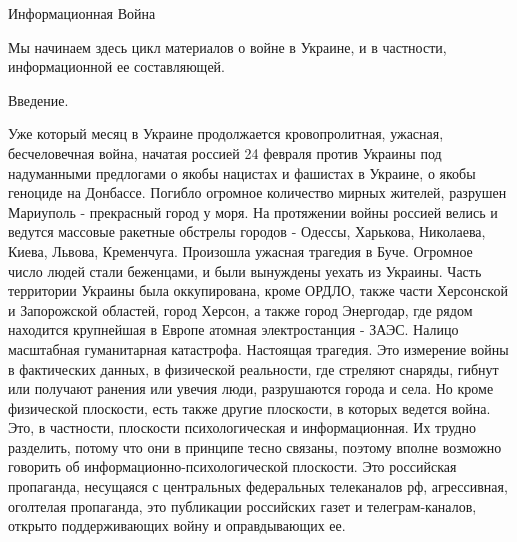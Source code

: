  
 
 
 
 

Информационная Война

Мы начинаем здесь цикл материалов о войне в Украине, и в частности,
информационной ее составляющей.

Введение.

Уже который месяц в Украине продолжается кровопролитная, ужасная, бесчеловечная
война, начатая россией 24 февраля против Украины под надуманными предлогами о
якобы нацистах и фашистах в Украине, о якобы геноциде на Донбассе. Погибло
огромное количество мирных жителей, разрушен Мариуполь - прекрасный город у
моря. На протяжении войны россией велись и ведутся массовые ракетные обстрелы
городов - Одессы, Харькова, Николаева, Киева, Львова, Кременчуга. Произошла
ужасная трагедия в Буче. Огромное число людей стали беженцами, и были вынуждены
уехать из Украины. Часть территории Украины была оккупирована, кроме ОРДЛО,
также части Херсонской и Запорожской областей, город Херсон, а также город
Энергодар, где рядом находится крупнейшая в Европе атомная электростанция -
ЗАЭС. Налицо масштабная гуманитарная катастрофа. Настоящая трагедия. Это
измерение войны в фактических данных, в физической реальности, где стреляют
снаряды, гибнут или получают ранения или увечия люди, разрушаются города и
села. Но кроме физической плоскости, есть также другие плоскости, в которых
ведется война. Это, в частности, плоскости психологическая и информационная.
Их трудно разделить, потому что они в принципе тесно связаны, поэтому вполне
возможно говорить об информационно-психологической плоскости. Это российская
пропаганда, несущаяся с центральных федеральных телеканалов рф, агрессивная,
оголтелая пропаганда, это публикации российских газет и телеграм-каналов,
открыто поддерживающих войну и оправдывающих ее.


